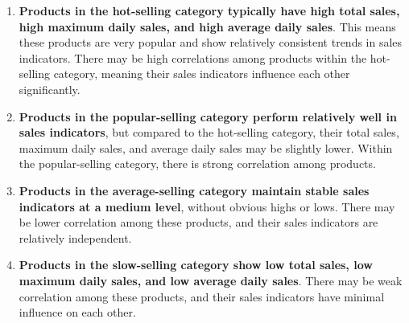 \documentclass{article}
\begin{document}
	\begin{enumerate}[label=\Roman*.]
		\item \textbf{Products in the hot-selling category typically have high total sales, high maximum daily sales, and high average daily sales}. This means these products are very popular and show relatively consistent trends in sales indicators. There may be high correlations among products within the hot-selling category, meaning their sales indicators influence each other significantly.
		
		\item \textbf{Products in the popular-selling category perform relatively well in sales indicators}, but compared to the hot-selling category, their total sales, maximum daily sales, and average daily sales may be slightly lower. Within the popular-selling category, there is strong correlation among products.
		
		\item \textbf{Products in the average-selling category maintain stable sales indicators at a medium level}, without obvious highs or lows. There may be lower correlation among these products, and their sales indicators are relatively independent.
		
		\item \textbf{Products in the slow-selling category show low total sales, low maximum daily sales, and low average daily sales}. There may be weak correlation among these products, and their sales indicators have minimal influence on each other.
	\end{enumerate}
	
	
\end{document}
